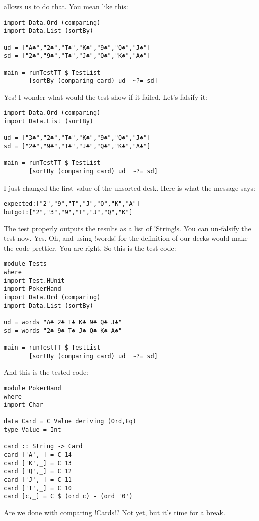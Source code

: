 allows us to do that.
\lhN You mean like this:
\begin{lstlisting}[frame=single]
import Data.Ord (comparing)
import Data.List (sortBy)

ud = ["A♣","2♣","T♣","K♣","9♣","Q♣","J♣"]
sd = ["2♣","9♣","T♣","J♣","Q♣","K♣","A♣"]

main = runTestTT $ TestList 
       [sortBy (comparing card) ud  ~?= sd]
\end{lstlisting} %
\lhA \success Yes!
\newpage \lhN I wonder what would the test show if it failed. Let's falsify it:
\begin{lstlisting}[frame=single]
import Data.Ord (comparing)
import Data.List (sortBy)

ud = ["3♣","2♣","T♣","K♣","9♣","Q♣","J♣"]
sd = ["2♣","9♣","T♣","J♣","Q♣","K♣","A♣"]

main = runTestTT $ TestList 
       [sortBy (comparing card) ud  ~?= sd]
\end{lstlisting} %
I just changed the first value of the unsorted desk. 
\lhA \failure Here is what the message says:
\begin{small}
\begin{alltt}
expected: ["2\monoclubs","9\monoclubs","T\monoclubs","J\monoclubs","Q\monoclubs","K\monoclubs","A\monoclubs"]
 but got: ["2\monoclubs","3\monoclubs","9\monoclubs","T\monoclubs","J\monoclubs","Q\monoclubs","K\monoclubs"]
\end{alltt}
\end{small}
The test properly outputs the results as a list of \il!String!s. You can un-falsify the test now.
\lhN Yes.
\lhA Oh, and using \il!words! for the definition of our decks would make the code prettier.
\lhN You are right. So this is the test code:
\begin{lstlisting}[frame=single]
module Tests
where 
import Test.HUnit
import PokerHand
import Data.Ord (comparing)
import Data.List (sortBy)

ud = words "A♣ 2♣ T♣ K♣ 9♣ Q♣ J♣"
sd = words "2♣ 9♣ T♣ J♣ Q♣ K♣ A♣"

main = runTestTT $ TestList 
       [sortBy (comparing card) ud  ~?= sd]
\end{lstlisting} %
\lhA \success And this is the tested code:
\begin{lstlisting}[frame=single]
module PokerHand
where
import Char

data Card = C Value deriving (Ord,Eq)
type Value = Int

card :: String -> Card
card ['A',_] = C 14
card ['K',_] = C 13
card ['Q',_] = C 12
card ['J',_] = C 11
card ['T',_] = C 10
card [c,_] = C $ (ord c) - (ord '0')
\end{lstlisting} %
\lhN Are we done with comparing \il!Cards!?
\lhA Not yet, but it's time for a break.
\lhend
